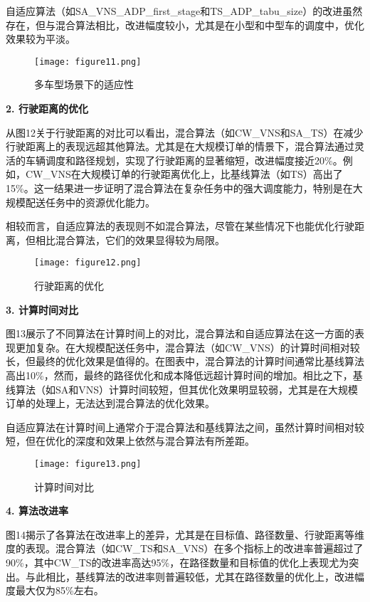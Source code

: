 \documentclass[12pt,a4paper,twoside]{ctexbook}
\begin{document}
自适应算法（如SA\_VNS\_ADP\_first\_stage和TS\_ADP\_tabu\_size）的改进虽然存在，但与混合算法相比，改进幅度较小，尤其是在小型和中型车的调度中，优化效果较为平淡。

\begin{figure}[H]
    \centering
    \texttt{[image: figure11.png]} %
    \caption{多车型场景下的适应性}
    \label{fig:multi_vehicle_adaptability}
\end{figure}

\textbf{2. 行驶距离的优化}

从图12关于行驶距离的对比可以看出，混合算法（如CW\_VNS和SA\_TS）在减少行驶距离上的表现远超其他算法。尤其是在大规模订单的情景下，混合算法通过灵活的车辆调度和路径规划，实现了行驶距离的显著缩短，改进幅度接近20\%。例如，CW\_VNS在大规模订单的行驶距离优化上，比基线算法（如TS）高出了15\%。这一结果进一步证明了混合算法在复杂任务中的强大调度能力，特别是在大规模配送任务中的资源优化能力。

相较而言，自适应算法的表现则不如混合算法，尽管在某些情况下也能优化行驶距离，但相比混合算法，它们的效果显得较为局限。

\begin{figure}[H]
    \centering
    \texttt{[image: figure12.png]} %
    \caption{行驶距离的优化}
    \label{fig:distance_optimization}
\end{figure}

\textbf{3. 计算时间对比}

图13展示了不同算法在计算时间上的对比，混合算法和自适应算法在这一方面的表现更加复杂。在大规模配送任务中，混合算法（如CW\_VNS）的计算时间相对较长，但最终的优化效果是值得的。在图表中，混合算法的计算时间通常比基线算法高出10\%，然而，最终的路径优化和成本降低远超计算时间的增加。相比之下，基线算法（如SA和VNS）计算时间较短，但其优化效果明显较弱，尤其是在大规模订单的处理上，无法达到混合算法的优化效果。

自适应算法在计算时间上通常介于混合算法和基线算法之间，虽然计算时间相对较短，但在优化的深度和效果上依然与混合算法有所差距。

\begin{figure}[H]
    \centering
    \texttt{[image: figure13.png]} %
    \caption{计算时间对比}
    \label{fig:computation_time_comparison}
\end{figure}

\textbf{4. 算法改进率}

图14揭示了各算法在改进率上的差异，尤其是在目标值、路径数量、行驶距离等维度的表现。混合算法（如CW\_TS和SA\_VNS）在多个指标上的改进率普遍超过了90\%，其中CW\_TS的改进率高达95\%，在路径数量和目标值的优化上表现尤为突出。与此相比，基线算法的改进率则普遍较低，尤其在路径数量的优化上，改进幅度最大仅为85\%左右。
\end{document}
